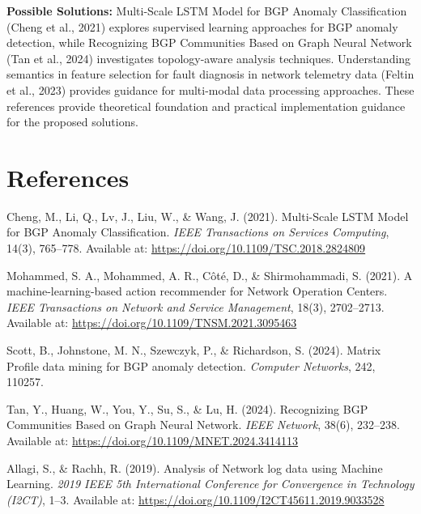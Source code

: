 \documentclass[11pt]{article}
\begin{document}
\textbf{Possible Solutions:} Multi-Scale LSTM Model for BGP Anomaly Classification (Cheng et al., 2021) explores supervised learning approaches for BGP anomaly detection, while Recognizing BGP Communities Based on Graph Neural Network (Tan et al., 2024) investigates topology-aware analysis techniques. Understanding semantics in feature selection for fault diagnosis in network telemetry data (Feltin et al., 2023) provides guidance for multi-modal data processing approaches. These references provide theoretical foundation and practical implementation guidance for the proposed solutions.

\section{References}

\begin{thebibliography}{9}

Cheng, M., Li, Q., Lv, J., Liu, W., \& Wang, J. (2021).
Multi-Scale LSTM Model for BGP Anomaly Classification.
\textit{IEEE Transactions on Services Computing}, 14(3), 765--778.
Available at: \href{https://doi.org/10.1109/TSC.2018.2824809}{https://doi.org/10.1109/TSC.2018.2824809}

Mohammed, S. A., Mohammed, A. R., Côté, D., \& Shirmohammadi, S. (2021).
A machine-learning-based action recommender for Network Operation Centers.
\textit{IEEE Transactions on Network and Service Management}, 18(3), 2702--2713.
Available at: \href{https://doi.org/10.1109/TNSM.2021.3095463}{https://doi.org/10.1109/TNSM.2021.3095463}

Scott, B., Johnstone, M. N., Szewczyk, P., \& Richardson, S. (2024).
Matrix Profile data mining for BGP anomaly detection.
\textit{Computer Networks}, 242, 110257.

Tan, Y., Huang, W., You, Y., Su, S., \& Lu, H. (2024).
Recognizing BGP Communities Based on Graph Neural Network.
\textit{IEEE Network}, 38(6), 232--238.
Available at: \href{https://doi.org/10.1109/MNET.2024.3414113}{https://doi.org/10.1109/MNET.2024.3414113}

Allagi, S., \& Rachh, R. (2019).
Analysis of Network log data using Machine Learning.
\textit{2019 IEEE 5th International Conference for Convergence in Technology (I2CT)}, 1--3.
Available at: \href{https://doi.org/10.1109/I2CT45611.2019.9033528}{https://doi.org/10.1109/I2CT45611.2019.9033528}


\end{thebibliography}
\end{document}

